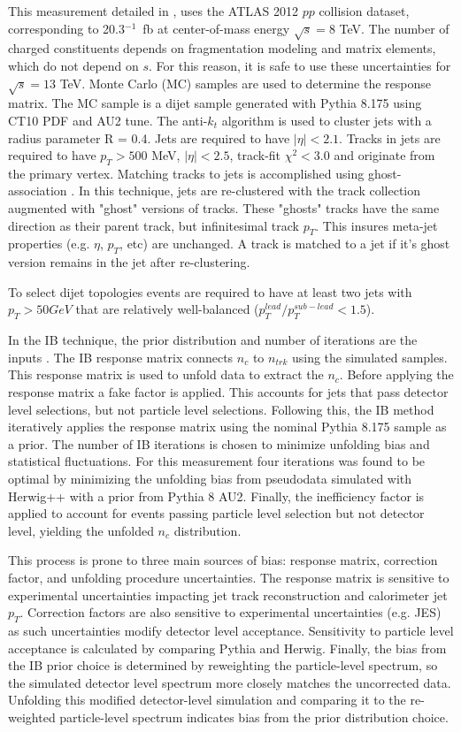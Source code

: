 This measurement detailed in \cite{Unfolding}, uses the ATLAS 2012 $pp$ collision dataset, corresponding to 20.3$^{-1}$~fb at center-of-mass energy $\sqrt{s}=8$ TeV. The number of charged constituents depends on fragmentation modeling and matrix elements, which do not depend on $s$. For this reason, it is safe to use these uncertainties for $\sqrt{s}=13$ TeV. Monte Carlo (MC) samples are used to determine the response matrix. The MC sample is a dijet sample generated with Pythia 8.175 using CT10 PDF and AU2 tune.  The anti-$k_{t}$ algorithm is used to cluster jets with a radius parameter R = 0.4. Jets are required to have $|\eta| < 2.1$. Tracks in jets are required to have $p_{T}>500$ MeV, $|\eta|<2.5$, track-fit $\chi^{2} < 3.0$ and originate from the primary vertex. Matching tracks to jets is accomplished using ghost-association \cite{ghost_association}. In this technique, jets are re-clustered with the track collection augmented with "ghost" versions of tracks.  These "ghosts" tracks have the same direction as their parent track, but infinitesimal track $p_{T}$. This insures meta-jet properties (e.g. $\eta$, $p_{T}$, etc) are unchanged. A track is matched to a jet if it's ghost version remains in the jet after re-clustering. 

To select dijet topologies events are required to have at least two jets with $p_{T} > 50GeV$ that are relatively well-balanced ($p_{T}^{lead}/p_{T}^{sub-lead} < 1.5$). 

In the IB technique, the prior distribution and number of iterations are the inputs \cite{ib_unfolding}. The IB response matrix connects $n_{c}$ to $n_{trk}$ using the simulated samples. This response matrix is used to unfold data to extract the $n_{c}$. Before applying the response matrix a fake factor is applied. This accounts for jets that pass detector level selections, but not particle level selections. Following this, the IB method iteratively applies the response matrix using the nominal Pythia 8.175 sample as a prior. The number of IB iterations is chosen to minimize unfolding bias and statistical fluctuations. For this measurement four iterations was found to be optimal by minimizing the unfolding bias from pseudodata simulated with Herwig++ with a prior from Pythia 8 AU2. Finally, the inefficiency factor is applied to account for events passing particle level selection but not detector level, yielding the unfolded $n_{c}$ distribution.
 
This process is prone to three main sources of bias: response matrix, correction factor, and unfolding procedure uncertainties. The response matrix is sensitive to experimental uncertainties impacting jet track reconstruction and calorimeter jet $p_{T}$. Correction factors are also sensitive to experimental uncertainties (e.g. JES) as such uncertainties modify detector level acceptance. Sensitivity to particle level acceptance is calculated by comparing Pythia and Herwig. Finally, the bias from the IB prior choice is determined by reweighting the particle-level spectrum, so the simulated detector level spectrum more closely matches the uncorrected data. Unfolding this modified detector-level simulation and comparing it to the re-weighted particle-level spectrum indicates bias from the prior distribution choice.

